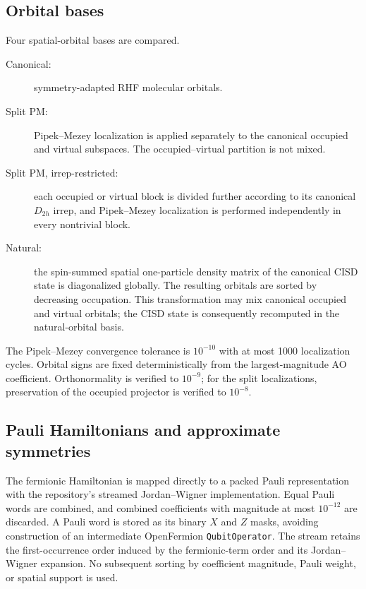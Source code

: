 \documentclass[a4paper,onecolumn,10pt]{article}
\begin{document}
\subsection{Orbital bases}

Four spatial-orbital bases are compared.
\begin{description}
    \item[Canonical:] symmetry-adapted RHF molecular orbitals.
    \item[Split PM:] Pipek--Mezey localization is applied separately to the
          canonical occupied and virtual subspaces.  The occupied--virtual
          partition is not mixed.
    \item[Split PM, irrep-restricted:] each occupied or virtual block is
          divided further according to its canonical $D_{2h}$ irrep, and
          Pipek--Mezey localization is performed independently in every
          nontrivial block.
    \item[Natural:] the spin-summed spatial one-particle density matrix of the
          canonical CISD state is diagonalized globally.  The resulting
          orbitals are sorted by decreasing occupation.  This transformation
          may mix canonical occupied and virtual orbitals; the CISD state is
          consequently recomputed in the natural-orbital basis.
\end{description}
The Pipek--Mezey convergence tolerance is $10^{-10}$ with at most 1000
localization cycles.  Orbital signs are fixed deterministically from the
largest-magnitude AO coefficient.  Orthonormality is verified to $10^{-9}$;
for the split localizations, preservation of the occupied projector is
verified to $10^{-8}$.

\subsection{Pauli Hamiltonians and approximate symmetries}

The fermionic Hamiltonian is mapped directly to a packed Pauli representation
with the repository's streamed Jordan--Wigner implementation.  Equal Pauli
words are combined, and combined coefficients with magnitude at most
$10^{-12}$ are discarded.  A Pauli word is stored as its binary $X$ and $Z$
masks, avoiding construction of an intermediate OpenFermion
\texttt{QubitOperator}.  The stream retains the first-occurrence order induced
by the fermionic-term order and its Jordan--Wigner expansion.  No subsequent
sorting by coefficient magnitude, Pauli weight, or spatial support is used.
\end{document}

